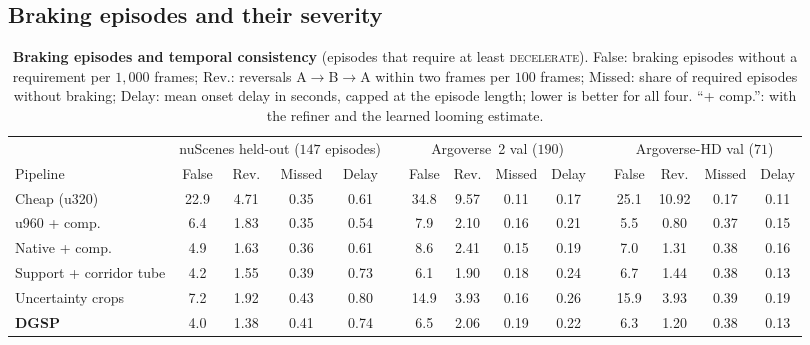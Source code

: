\documentclass[10pt,letterpaper]{article}
\newcommand{\method}{DGSP\xspace}
\newcommand{\oursrow}{\rowcolor{oursbg}}
\theoremstyle{remark}
\theoremstyle{plain}
\theoremstyle{definition}
\begin{document}
\subsection{Braking episodes and their severity}
\label{sec:supp_episodes}

\begin{table}[!tbp]
\centering
\caption{\textbf{Braking episodes and temporal consistency} (episodes that require at least \textsc{decelerate}). False: braking episodes without a requirement per $1{,}000$ frames; Rev.: reversals A$\to$B$\to$A within two frames per $100$ frames; Missed: share of required episodes without braking; Delay: mean onset delay in seconds, capped at the episode length; lower is better for all four. ``+ comp.'': with the refiner and the learned looming estimate.}
\label{tab:episodes}
\footnotesize
\setlength{\tabcolsep}{3.4pt}
\begin{tabular}{@{}lcccccccccccccc@{}}
\toprule
 & \multicolumn{4}{c}{nuScenes held-out ($147$ episodes)} & & \multicolumn{4}{c}{Argoverse~2 val ($190$)} & & \multicolumn{4}{c}{Argoverse-HD val ($71$)} \\
\cmidrule(lr){2-5}\cmidrule(lr){7-10}\cmidrule(l){12-15}
Pipeline & False & Rev. & Missed & Delay & & False & Rev. & Missed & Delay & & False & Rev. & Missed & Delay \\
\midrule
Cheap (u320) & 22.9 & 4.71 & 0.35 & 0.61 &  & 34.8 & 9.57 & 0.11 & 0.17 &  & 25.1 & 10.92 & 0.17 & 0.11 \\
u960 + comp. & 6.4 & 1.83 & 0.35 & 0.54 &  & 7.9 & 2.10 & 0.16 & 0.21 &  & 5.5 & 0.80 & 0.37 & 0.15 \\
Native + comp. & 4.9 & 1.63 & 0.36 & 0.61 &  & 8.6 & 2.41 & 0.15 & 0.19 &  & 7.0 & 1.31 & 0.38 & 0.16 \\
Support + corridor tube & 4.2 & 1.55 & 0.39 & 0.73 &  & 6.1 & 1.90 & 0.18 & 0.24 &  & 6.7 & 1.44 & 0.38 & 0.13 \\
Uncertainty crops & 7.2 & 1.92 & 0.43 & 0.80 &  & 14.9 & 3.93 & 0.16 & 0.26 &  & 15.9 & 3.93 & 0.39 & 0.19 \\
\midrule
\oursrow \textbf{\method} & 4.0 & 1.38 & 0.41 & 0.74 &  & 6.5 & 2.06 & 0.19 & 0.22 &  & 6.3 & 1.20 & 0.38 & 0.13 \\
\bottomrule
\end{tabular}
\end{table}
\end{document}
